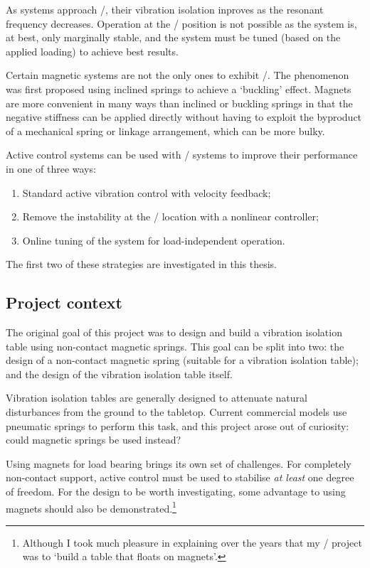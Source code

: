 As systems approach \qzs/, their vibration isolation inproves as the resonant
frequency decreases.
Operation at the \qzs/ position is not possible as the
system is, at best, only marginally stable, and the system must be tuned
(based on the applied loading) to achieve best results.

Certain magnetic systems are not the only ones to exhibit \qzs/.
The phenomenon
was first proposed using inclined springs to achieve a `buckling' effect.
Magnets are more convenient in many ways than inclined or buckling springs in
that the negative stiffness can be applied directly without having to exploit
the byproduct of a mechanical spring or linkage arrangement, which can be more
bulky.

Active control systems can be used with \qzs/ systems to improve their 
performance in one of three ways:
\begin{enumerate}
  \item Standard active vibration control with velocity feedback;
  \item Remove the instability at the \qzs/ location with a nonlinear controller;
  \item Online tuning of the system for load-independent operation.
\end{enumerate}
The first two of these strategies are investigated in this thesis.

\subsection{Project context}

The original goal of this project was to design and build a vibration
isolation table using non-contact magnetic springs.
This goal can be
split into two: the design of a non-contact magnetic spring (suitable
for a vibration isolation table); and the design of the vibration
isolation table itself.

Vibration isolation tables are generally designed to attenuate natural
disturbances from the ground to the tabletop.
Current commercial models use
pneumatic springs to perform this task, and this project arose out of
curiosity: could magnetic springs be used instead?

Using magnets for load bearing brings its own set of challenges.
For completely non-contact support, active control must be used to
stabilise \emph{at least} one degree of freedom.
For the design to be
worth investigating, some advantage to using magnets should also be
demonstrated.\footnote{Although I took much pleasure in explaining
  over the years that my \PhD/ project was to `build a table that
  floats on magnets'.}

